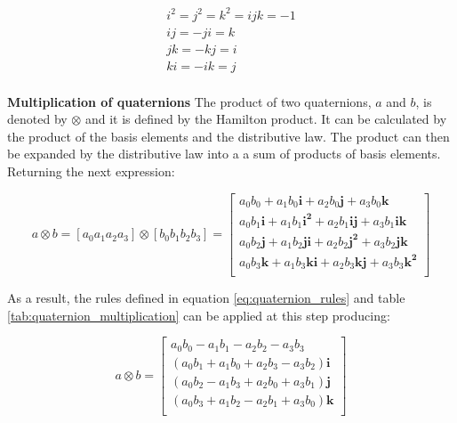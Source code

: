 \begin{equation}
  \begin{gathered}
    i^2=j^2=k^2=ijk=-1 \\
    ij = -ji = k       \\
    jk = -kj = i       \\
    ki = -ik = j       \\
  \end{gathered}
  \label{eq:quaternion_rules}
\end{equation}

\begin{figure}[H]
  \centering
  
\end{figure}

\item \textbf{Multiplication of quaternions} The product of two quaternions, $a$ and $b$, is denoted by $\otimes$ and it is defined by the Hamilton product. It can be calculated by the product of the basis elements and the distributive law. The product can then be expanded by the distributive law into a a sum of products of basis elements. Returning the next expression:

\begin{equation}
  a \otimes b = \left[a_0 a_1 a_2 a_3\right] \otimes \left[b_0 b_1 b_2 b_3\right]     =
  \begin{bmatrix}
    a_0 b_0 + a_1 b_0\boldsymbol{i} + a_2 b_0\boldsymbol{j} + a_3 b_0\boldsymbol{k}                   \\
    a_0 b_1\boldsymbol{i} + a_1 b_1\boldsymbol{i^2} + a_2 b_1\boldsymbol{ij} + a_3 b_1\boldsymbol{ik} \\
    a_0 b_2\boldsymbol{j}+ a_1 b_2\boldsymbol{ji} + a_2 b_2\boldsymbol{j^2} + a_3 b_2\boldsymbol{jk}  \\
    a_0 b_3\boldsymbol{k} + a_1 b_3\boldsymbol{ki} + a_2 b_3\boldsymbol{kj} + a_3 b_3\boldsymbol{k^2} \\
  \end{bmatrix}
\end{equation}

As a result, the rules defined in equation \ref{eq:quaternion_rules} and table \ref{tab:quaternion_multiplication} can be applied at this step producing:

\begin{equation}
  a \otimes b =
  \begin{bmatrix}
    a_0 b_0 - a_1 b_1 - a_2 b_2 - a_3 b_3                 \\
    (a_0 b_1 + a_1 b_0 + a_2 b_3 - a_3 b_2)\boldsymbol{i} \\
    (a_0 b_2 - a_1 b_3 + a_2 b_0 + a_3 b_1)\boldsymbol{j} \\
    (a_0 b_3 + a_1 b_2 - a_2 b_1 + a_3 b_0)\boldsymbol{k} \\
  \end{bmatrix}
  \label{eq:quaternion_matrix}
\end{equation}

